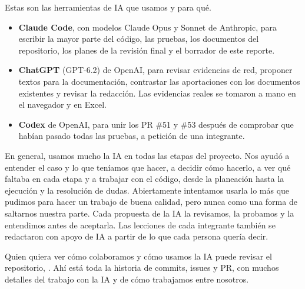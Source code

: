 Estas son las herramientas de IA que usamos y para qué.

\begin{itemize}
  \item \textbf{Claude Code}, con modelos Claude Opus y Sonnet de Anthropic, para escribir la mayor parte del código, las pruebas, los documentos del repositorio, los planes de la revisión final y el borrador de este reporte.
  \item \textbf{ChatGPT} (GPT-6.2) de OpenAI, para revisar evidencias de red, proponer textos para la documentación, contrastar las aportaciones con los documentos existentes y revisar la redacción. Las evidencias reales se tomaron a mano en el navegador y en Excel.
  \item \textbf{Codex} de OpenAI, para unir los PR \#51 y \#53 después de comprobar que habían pasado todas las pruebas, a petición de una integrante.
\end{itemize}

En general, usamos mucho la IA en todas las etapas del proyecto. Nos ayudó a entender el caso y lo que teníamos que hacer, a decidir cómo hacerlo, a ver qué faltaba en cada etapa y a trabajar con el código, desde la planeación hasta la ejecución y la resolución de dudas. Abiertamente intentamos usarla lo más que pudimos para hacer un trabajo de buena calidad, pero nunca como una forma de saltarnos nuestra parte. Cada propuesta de la IA la revisamos, la probamos y la entendimos antes de aceptarla. Las lecciones de cada integrante también se redactaron con apoyo de IA a partir de lo que cada persona quería decir.

Quien quiera ver cómo colaboramos y cómo usamos la IA puede revisar el repositorio, \urlrepo{}. Ahí está toda la historia de commits, issues y PR, con muchos detalles del trabajo con la IA y de cómo trabajamos entre nosotros.
